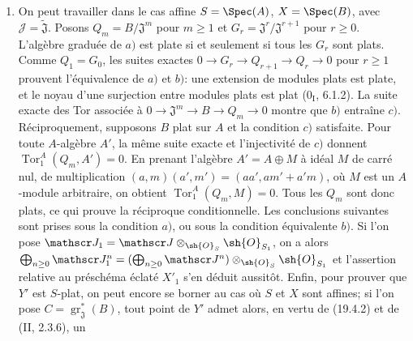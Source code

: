 \begin{enumerate}
  \item[(i)] On peut travailler dans le cas affine $S=\Spec(A)$, $X=\Spec(B)$, avec $\mathscr J=\widetilde{\mathfrak J}$. Posons $Q_m=B/\mathfrak J^m$ pour $m\geq1$ et $G_r=\mathfrak J^r/\mathfrak J^{r+1}$ pour $r\geq0$. L'algèbre graduée de $a)$ est plate si et seulement si tous les $G_r$ sont plats. Comme $Q_1=G_0$, les suites exactes $0\to G_r\to Q_{r+1}\to Q_r\to0$ pour $r\geq1$ prouvent l'équivalence de $a)$ et $b)$: une extension de modules plats est plate, et le noyau d'une surjection entre modules plats est plat ($0_{\mathrm I}$, 6.1.2). La suite exacte des Tor associée à $0\to\mathfrak J^m\to B\to Q_m\to0$ montre que $b)$ entraîne $c)$. Réciproquement, supposons $B$ plat sur $A$ et la condition $c)$ satisfaite. Pour toute $A$-algèbre $A'$, la même suite exacte et l'injectivité de $c)$ donnent $\operatorname{Tor}_1^A(Q_m,A')=0$. En prenant l'algèbre $A'=A\oplus M$ à idéal $M$ de carré nul, de multiplication $(a,m)(a',m')=(aa',am'+a'm)$, où $M$ est un $A$-module arbitraire, on obtient $\operatorname{Tor}_1^A(Q_m,M)=0$. Tous les $Q_m$ sont donc plats, ce qui prouve la réciproque conditionnelle. Les conclusions suivantes sont prises sous la condition $a)$, ou sous la condition équivalente $b)$. Si l'on pose $\mathscr J_1=\mathscr J\otimes_{\sh{O}_S}\sh{O}_{S_1}$, on a alors $\bigoplus_{n\geq0}\mathscr J_1^n=(\bigoplus_{n\geq0}\mathscr J^n)\otimes_{\sh{O}_S}\sh{O}_{S_1}$ et l'assertion relative au préschéma éclaté $X'_1$ s'en déduit aussitôt. Enfin, pour prouver que $Y'$ est $S$-plat, on peut encore se borner au cas où $S$ et $X$ sont affines; si l'on pose $C=\operatorname{gr}_{\mathfrak J}^*(B)$, tout point de $Y'$ admet alors, en vertu de (19.4.2) et de (II, 2.3.6), un



\end{enumerate}
